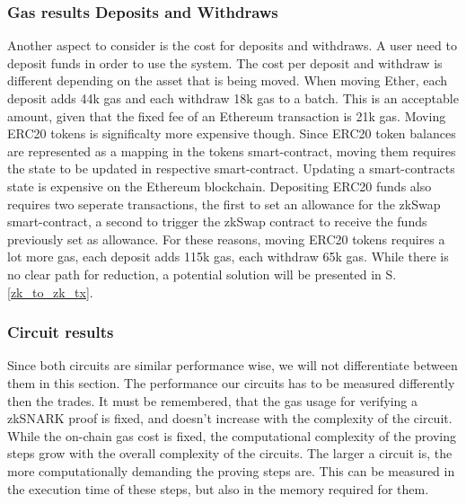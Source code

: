 \documentclass[../../thesis.tex]{subfiles}
\begin{document}
\subsubsection{Gas results Deposits and Withdraws}
Another aspect to consider is the cost for deposits and withdraws. A user need to deposit funds in order to use the system. The cost per deposit and withdraw is different depending on the asset that is being moved. When moving Ether, each deposit adds 44k gas and each withdraw 18k gas to a batch. This is an acceptable amount, given that the fixed fee of an Ethereum transaction is 21k gas. Moving ERC20 tokens is significalty more expensive though. Since ERC20 token balances are represented as a mapping in the tokens smart-contract, moving them requires the state to be updated in respective smart-contract. Updating a smart-contracts state is expensive on the Ethereum blockchain. Depositing ERC20 funds also requires two seperate transactions, the first to set an allowance for the zkSwap smart-contract, a second to trigger the zkSwap contract to receive the funds previously set as allowance. For these reasons, moving ERC20 tokens requires a lot more gas, each deposit adds 115k gas, each withdraw 65k gas. While there is no clear path for reduction, a potential solution will be presented in S. \ref{zk_to_zk_tx}.

\subsubsection{Circuit results}
Since both circuits are similar performance wise, we will not differentiate between them in this section. The performance our circuits has to be measured differently then the trades. It must be remembered, that the gas usage for verifying a zkSNARK proof is fixed, and doesn't increase with the complexity of the circuit. While the on-chain gas cost is fixed, the computational complexity of the proving steps grow with the overall complexity of the circuits. The larger a circuit is, the more computationally demanding the proving steps are. This can be measured in the execution time of these steps, but also in the memory required for them.
\end{document}
